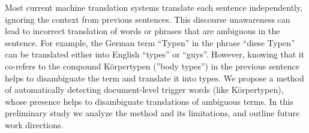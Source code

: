 Most current machine translation systems translate each sentence independently, ignoring the context from previous sentences. This discourse unawareness can lead to incorrect translation of words or phrases that are ambiguous in the sentence. For example, the German term ``Typen'' in the phrase ``diese Typen'' can be translated either into English ``types'' or ``guys''. However, knowing that it co-refers to the compound Körpertypen (''body types'') in the previous sentence helps to disambiguate the term and translate it into types. We propose a method of automatically detecting document-level trigger words (like Körpertypen), whose presence helps to disambiguate translations of ambiguous terms. In this preliminary study we analyze the method and its limitations, and outline future work directions.
